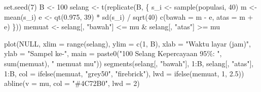 \documentclass[
  indonesian,
  letterpaper,
]{book}
\newenvironment{Shaded}{\begin{snugshade}}{\end{snugshade}}
\newcommand{\AttributeTok}[1]{\textcolor[rgb]{0.40,0.45,0.13}{#1}}
\newcommand{\ConstantTok}[1]{\textcolor[rgb]{0.56,0.35,0.01}{#1}}
\newcommand{\DecValTok}[1]{\textcolor[rgb]{0.68,0.00,0.00}{#1}}
\newcommand{\FloatTok}[1]{\textcolor[rgb]{0.68,0.00,0.00}{#1}}
\newcommand{\FunctionTok}[1]{\textcolor[rgb]{0.28,0.35,0.67}{#1}}
\newcommand{\NormalTok}[1]{\textcolor[rgb]{0.00,0.23,0.31}{#1}}
\newcommand{\OtherTok}[1]{\textcolor[rgb]{0.00,0.23,0.31}{#1}}
\newcommand{\SpecialCharTok}[1]{\textcolor[rgb]{0.37,0.37,0.37}{#1}}
\newcommand{\StringTok}[1]{\textcolor[rgb]{0.13,0.47,0.30}{#1}}
\begin{document}
\begin{Shaded}
\begin{Highlighting}[]
\FunctionTok{set.seed}\NormalTok{(}\DecValTok{7}\NormalTok{)}
\NormalTok{B }\OtherTok{\textless{}{-}} \DecValTok{100}
\NormalTok{selang }\OtherTok{\textless{}{-}} \FunctionTok{t}\NormalTok{(}\FunctionTok{replicate}\NormalTok{(B, \{}
\NormalTok{  s\_i }\OtherTok{\textless{}{-}} \FunctionTok{sample}\NormalTok{(populasi, }\DecValTok{40}\NormalTok{)}
\NormalTok{  m }\OtherTok{\textless{}{-}} \FunctionTok{mean}\NormalTok{(s\_i)}
\NormalTok{  e }\OtherTok{\textless{}{-}} \FunctionTok{qt}\NormalTok{(}\FloatTok{0.975}\NormalTok{, }\DecValTok{39}\NormalTok{) }\SpecialCharTok{*} \FunctionTok{sd}\NormalTok{(s\_i) }\SpecialCharTok{/} \FunctionTok{sqrt}\NormalTok{(}\DecValTok{40}\NormalTok{)}
  \FunctionTok{c}\NormalTok{(}\AttributeTok{bawah =}\NormalTok{ m }\SpecialCharTok{{-}}\NormalTok{ e, }\AttributeTok{atas =}\NormalTok{ m }\SpecialCharTok{+}\NormalTok{ e)}
\NormalTok{\}))}
\NormalTok{memuat }\OtherTok{\textless{}{-}}\NormalTok{ selang[, }\StringTok{"bawah"}\NormalTok{] }\SpecialCharTok{\textless{}=}\NormalTok{ mu }\SpecialCharTok{\&}\NormalTok{ selang[, }\StringTok{"atas"}\NormalTok{] }\SpecialCharTok{\textgreater{}=}\NormalTok{ mu}

\FunctionTok{plot}\NormalTok{(}\ConstantTok{NULL}\NormalTok{, }\AttributeTok{xlim =} \FunctionTok{range}\NormalTok{(selang), }\AttributeTok{ylim =} \FunctionTok{c}\NormalTok{(}\DecValTok{1}\NormalTok{, B),}
     \AttributeTok{xlab =} \StringTok{"Waktu layar (jam)"}\NormalTok{, }\AttributeTok{ylab =} \StringTok{"Sampel ke{-}"}\NormalTok{,}
     \AttributeTok{main =} \FunctionTok{paste0}\NormalTok{(}\StringTok{"100 Selang Kepercayaan 95\%: "}\NormalTok{, }\FunctionTok{sum}\NormalTok{(memuat), }\StringTok{" memuat mu"}\NormalTok{))}
\FunctionTok{segments}\NormalTok{(selang[, }\StringTok{"bawah"}\NormalTok{], }\DecValTok{1}\SpecialCharTok{:}\NormalTok{B, selang[, }\StringTok{"atas"}\NormalTok{], }\DecValTok{1}\SpecialCharTok{:}\NormalTok{B,}
         \AttributeTok{col =} \FunctionTok{ifelse}\NormalTok{(memuat, }\StringTok{"grey50"}\NormalTok{, }\StringTok{"firebrick"}\NormalTok{),}
         \AttributeTok{lwd =} \FunctionTok{ifelse}\NormalTok{(memuat, }\DecValTok{1}\NormalTok{, }\FloatTok{2.5}\NormalTok{))}
\FunctionTok{abline}\NormalTok{(}\AttributeTok{v =}\NormalTok{ mu, }\AttributeTok{col =} \StringTok{"\#4C72B0"}\NormalTok{, }\AttributeTok{lwd =} \DecValTok{2}\NormalTok{)}
\end{Highlighting}
\end{Shaded}
\end{document}
